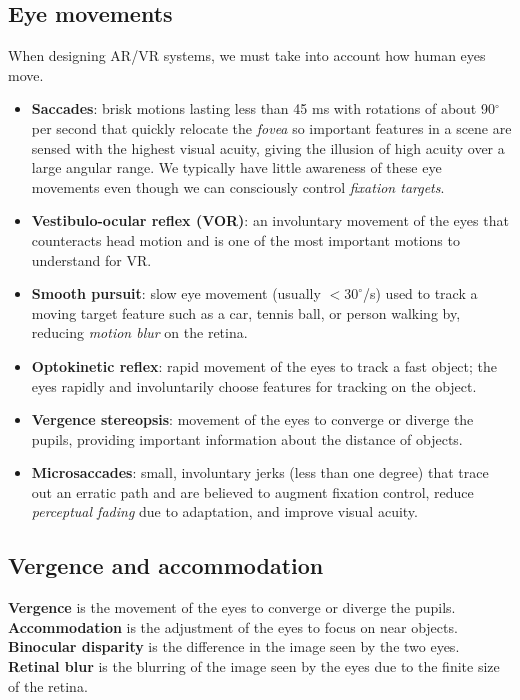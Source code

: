 \documentclass[11pt,a4paper]{article}
\theoremstyle{definition}
\theoremstyle{plain}
\theoremstyle{remark}
\begin{document}
\subsection{Eye movements}
When designing AR/VR systems, we must take into account how human eyes move.
\begin{itemize}
    \item \textbf{Saccades}: brisk motions lasting less than 45 ms with rotations of about 90$^\circ$ per second that quickly relocate the \textit{fovea} so important features in a scene are sensed with the highest visual acuity, giving the illusion of high acuity over a large angular range. We typically have little awareness of these eye movements even though we can consciously control \textit{fixation targets}.
    \item \textbf{Vestibulo-ocular reflex (VOR)}: an involuntary movement of the eyes that counteracts head motion and is one of the most important motions to understand for VR.
    \item \textbf{Smooth pursuit}: slow eye movement (usually $<30^\circ$/s) used to track a moving target feature such as a car, tennis ball, or person walking by, reducing \textit{motion blur} on the retina.
    \item \textbf{Optokinetic reflex}: rapid movement of the eyes to track a fast object; the eyes rapidly and involuntarily choose features for tracking on the object.
    \item \textbf{Vergence stereopsis}: movement of the eyes to converge or diverge the pupils, providing important information about the distance of objects.
    \item \textbf{Microsaccades}: small, involuntary jerks (less than one degree) that trace out an erratic path and are believed to augment fixation control, reduce \textit{perceptual fading} due to adaptation, and improve visual acuity.
\end{itemize}


\subsection{Vergence and accommodation}
\textbf{Vergence} is the movement of the eyes to converge or diverge the pupils.
\textbf{Accommodation} is the adjustment of the eyes to focus on near objects.
\textbf{Binocular disparity} is the difference in the image seen by the two eyes.
\textbf{Retinal blur} is the blurring of the image seen by the eyes due to the finite size of the retina.
\end{document}
